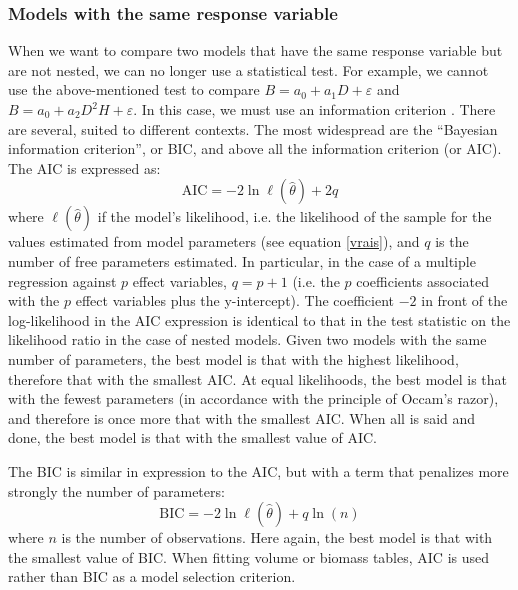 \subsubsection{Models with the same response variable}

When we want to compare two models that have the same response variable but are not nested, we can no longer use a statistical test. For example, we cannot use the above-mentioned test to compare $B=a_0+a_1D+\varepsilon$ and $B=a_0+a_2D^2H+\varepsilon$. In this case, we must use an information criterion \citep{bozdogan87,burnham02,burnham04}. There are several, suited to different contexts. The most widespread are the ``Bayesian information criterion'', or BIC, and above all the \citet{akaike74} information criterion (or AIC). The AIC is expressed as:
\[
\mathrm{AIC}=-2\ln\ell(\hat{\theta})+2q
\]
where $\ell(\hat{\theta})$ if the model's likelihood, i.e. the likelihood of the sample for the values estimated from model parameters (see equation \ref{vrais}), and $q$ is the number of free parameters estimated. In particular, in the case of a multiple regression against $p$ effect variables, $q=p+1$ (i.e. the $p$ coefficients associated with the $p$ effect variables
plus the y-intercept). The coefficient $-2$ in front of the log-likelihood in the AIC expression is identical to that in the test statistic on the likelihood ratio in the case of nested models. Given two models with the same number of parameters, the best model is that with the highest likelihood, therefore that with the smallest AIC. At equal likelihoods, the best model is that with the fewest parameters (in accordance with the principle of Occam's razor), and therefore is once more that with the smallest AIC. When all is said and done, the best model is that with the smallest value of AIC.

The BIC is similar in expression to the AIC, but with a term that penalizes more strongly the number of parameters:
\[
\mathrm{BIC}=-2\ln\ell(\hat{\theta})+q\ln(n)
\]
where $n$ is the number of observations. Here again, the best model is that with the smallest value of BIC. When fitting volume or biomass tables, AIC is used rather than BIC as a model selection criterion.


